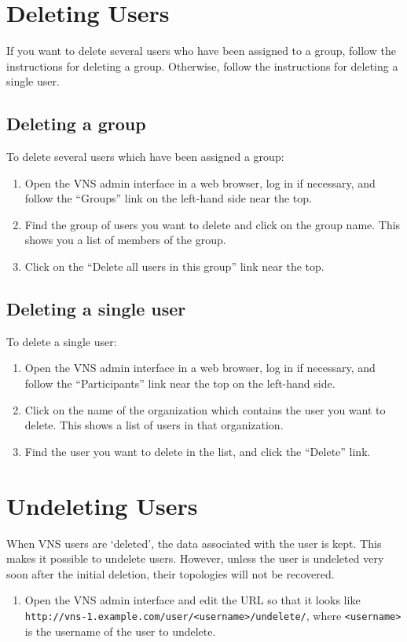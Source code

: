 \documentclass[a4paper,12pt]{report}
\begin{document}
\section{Deleting Users}
If you want to delete several users who have been assigned to a group, follow the instructions for deleting a group.  Otherwise, follow the instructions for deleting a single user.

\subsection{Deleting a group}
To delete several users which have been assigned a group:
\begin{enumerate}
\item Open the VNS admin interface in a web browser, log in if necessary, and follow the ``Groups'' link on the left-hand side near the top.
\item Find the group of users you want to delete and click on the group name.  This shows you a list of members of the group.
\item Click on the ``Delete all users in this group'' link near the top.
\end{enumerate}

\subsection{Deleting a single user}
To delete a single user:
\begin{enumerate}
\item Open the VNS admin interface in a web browser, log in if necessary, and follow the ``Participants'' link near the top on the left-hand side.
\item Click on the name of the organization which contains the user you want to delete.  This shows a list of users in that organization.
\item Find the user you want to delete in the list, and click the ``Delete'' link.
\end{enumerate}

\section{Undeleting Users}
When VNS users are `deleted', the data associated with the user is kept.  This makes it possible to undelete users.  However, unless the user is undeleted very soon after the initial deletion, their topologies will not be recovered.
\begin{enumerate}
\item Open the VNS admin interface and edit the URL so that it looks like \texttt{http://vns-1.example.com/user/<username>/undelete/}, where \texttt{<username>} is the username of the user to undelete.
\end{enumerate}
\end{document}
